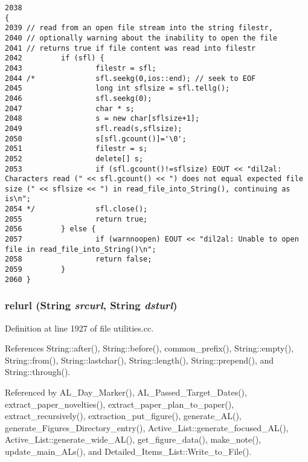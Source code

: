 \footnotesize\begin{verbatim}2038                                                                                      {
2039 // read from an open file stream into the string filestr,
2040 // optionally warning about the inability to open the file
2041 // returns true if file content was read into filestr
2042         if (sfl) {
2043                 filestr = sfl;
2044 /*              sfl.seekg(0,ios::end); // seek to EOF
2045                 long int sflsize = sfl.tellg();
2046                 sfl.seekg(0);
2047                 char * s;
2048                 s = new char[sflsize+1];
2049                 sfl.read(s,sflsize);
2050                 s[sfl.gcount()]='\0';
2051                 filestr = s;
2052                 delete[] s;
2053                 if (sfl.gcount()!=sflsize) EOUT << "dil2al: Characters read (" << sfl.gcount() << ") does not equal expected file size (" << sflsize << ") in read_file_into_String(), continuing as is\n";
2054 */              sfl.close();
2055                 return true;
2056         } else {
2057                 if (warnnoopen) EOUT << "dil2al: Unable to open file in read_file_into_String()\n";
2058                 return false;
2059         }
2060 }
\end{verbatim}\normalsize 
{}
\subsubsection{ relurl ({\bf String} {\em srcurl}, {\bf String} {\em dsturl})}\label{utilities_8cc_a30}




Definition at line 1927 of file utilities.cc.

References String::after(), String::before(), common\_\-prefix(), String::empty(), String::from(), String::lastchar(), String::length(), String::prepend(), and String::through().

Referenced by AL\_\-Day\_\-Marker(), AL\_\-Passed\_\-Target\_\-Dates(), extract\_\-paper\_\-novelties(), extract\_\-paper\_\-plan\_\-to\_\-paper(), extract\_\-recursively(), extraction\_\-put\_\-figure(), generate\_\-AL(), generate\_\-Figures\_\-Directory\_\-entry(), Active\_\-List::generate\_\-focused\_\-AL(), Active\_\-List::generate\_\-wide\_\-AL(), get\_\-figure\_\-data(), make\_\-note(), update\_\-main\_\-ALs(), and Detailed\_\-Items\_\-List::Write\_\-to\_\-File().



